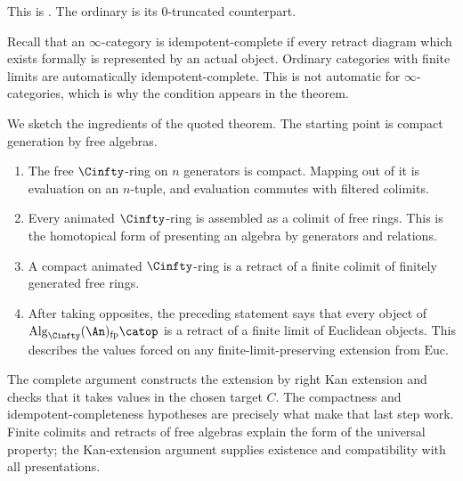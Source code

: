
This is \citet[Theorem~3.22]{Carchedi_Steffens_Universal_Derived_Manifolds}.
The ordinary  is its
$0$-truncated counterpart.

Recall that an $\infty$-category is idempotent-complete if every retract
diagram which exists formally is represented by an actual object. Ordinary
categories with finite limits are automatically idempotent-complete. This is
not automatic for $\infty$-categories, which is why the condition appears in
the theorem.

We sketch the ingredients of the quoted theorem. The starting point is
compact generation by free algebras.

\begin{enumerate}
  \item The free $\Cinfty$-ring on $n$ generators is compact. Mapping out of
    it is evaluation on an $n$-tuple, and evaluation commutes with filtered
    colimits.
  \item Every animated $\Cinfty$-ring is assembled as a colimit of free
    rings. This is the homotopical form of presenting an algebra by generators
    and relations.
  \item A compact animated $\Cinfty$-ring is a retract of a finite colimit of
    finitely generated free rings.
  \item After taking opposites, the preceding statement says that every object
    of
    $\operatorname{Alg}_{\Cinfty}(\An)_{\mathrm{fp}}\catop$
    is a retract of a finite limit of Euclidean objects. This describes the values forced on any finite-limit-preserving
    extension from $\mathrm{Euc}$.
\end{enumerate}

The complete argument constructs the extension by right Kan extension and
checks that it takes values in the chosen target $C$. The compactness and
idempotent-completeness hypotheses are precisely what make that last step
work. Finite colimits and retracts of free algebras explain the form of the
universal property; the Kan-extension argument supplies existence and
compatibility with all presentations.

